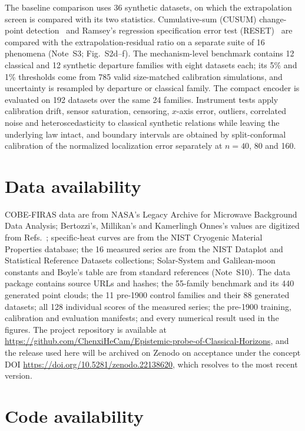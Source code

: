 \documentclass{article}
\begin{document}
The baseline comparison uses 36 synthetic datasets, on which the extrapolation screen is compared with its two statistics. Cumulative-sum (CUSUM) change-point detection~\cite{page1954cusum}
and Ramsey's regression specification error test (RESET)~\cite{ramsey1969} are compared with the extrapolation-residual ratio on a separate suite of 16 phenomena (Note~S3; Fig.~S2d--f). The mechanism-level benchmark contains
12 classical and 12 synthetic departure families with eight datasets each; its 5\% and 1\%
thresholds come from 785 valid size-matched calibration simulations, and
uncertainty is resampled by departure or classical family. The compact encoder is evaluated on 192 datasets over the same 24 families. Instrument tests apply
calibration drift, sensor saturation, censoring, $x$-axis error, outliers,
correlated noise and heteroscedasticity to classical synthetic relations while
leaving the underlying law intact, and boundary intervals are obtained by
split-conformal calibration of the normalized localization error separately at
$n = 40$, 80 and 160.

\section{Data availability}

COBE-FIRAS data are from NASA's Legacy Archive for Microwave Background Data Analysis; Bertozzi's, Millikan's and Kamerlingh Onnes's values are digitized from Refs.~\cite{bertozzi1964,millikan1916,onnes1911}; specific-heat curves are from the NIST Cryogenic Material Properties database; the 16 measured series are from the NIST Dataplot and Statistical Reference Datasets collections; Solar-System and Galilean-moon constants and Boyle's table are from standard references (Note~S10). The data package
contains source URLs and hashes; the 55-family benchmark and its 440 generated point clouds; the 11 pre-1900 control families and their 88 generated datasets; all 128 individual scores of the measured series; the
pre-1900 training, calibration and evaluation manifests; and every numerical
result used in the figures. The project repository is available at
\url{https://github.com/ChenxiHeCam/Epistemic-probe-of-Classical-Horizons}, and the release used here will be archived on Zenodo on acceptance under the concept DOI \url{https://doi.org/10.5281/zenodo.22138620}, which resolves to the most recent version.

\section{Code availability}
\end{document}
